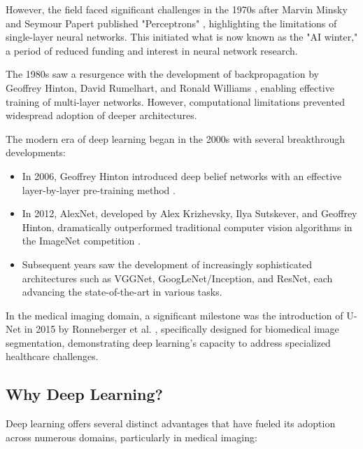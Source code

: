 However, the field faced significant challenges in the 1970s after Marvin Minsky and Seymour Papert published "Perceptrons" \cite{minsky1969perceptrons}, highlighting the limitations of single-layer neural networks. This initiated what is now known as the "AI winter," a period of reduced funding and interest in neural network research.

The 1980s saw a resurgence with the development of backpropagation by Geoffrey Hinton, David Rumelhart, and Ronald Williams \cite{rumelhart1986learning}, enabling effective training of multi-layer networks. However, computational limitations prevented widespread adoption of deeper architectures.

The modern era of deep learning began in the 2000s with several breakthrough developments:
\begin{itemize}
  \item In 2006, Geoffrey Hinton introduced deep belief networks with an effective layer-by-layer pre-training method \cite{hinton2006fast}.
  \item In 2012, AlexNet, developed by Alex Krizhevsky, Ilya Sutskever, and Geoffrey Hinton, dramatically outperformed traditional computer vision algorithms in the ImageNet competition \cite{krizhevsky2012imagenet}.
  \item Subsequent years saw the development of increasingly sophisticated architectures such as VGGNet, GoogLeNet/Inception, and ResNet, each advancing the state-of-the-art in various tasks.
\end{itemize}

In the medical imaging domain, a significant milestone was the introduction of U-Net in 2015 by Ronneberger et al. \cite{ronneberger2015unet}, specifically designed for biomedical image segmentation, demonstrating deep learning's capacity to address specialized healthcare challenges.

\subsection{Why Deep Learning?}
\label{sec:why_dl}
Deep learning offers several distinct advantages that have fueled its adoption across numerous domains, particularly in medical imaging:

